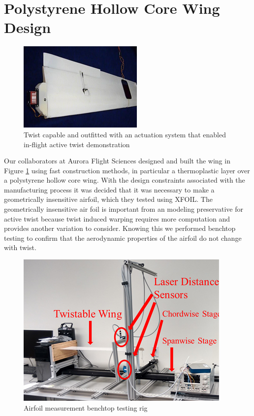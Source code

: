 \documentclass[11pt]{ucthesis}
\begin{document}
\section{Polystyrene Hollow Core Wing Design}

\begin{figure}[h]
\centering
\includegraphics[width=0.5\linewidth]{Figures/AuroraWing.png}
\caption{Twist capable and outfitted with an actuation system that enabled in-flight active twist demonstration}
\label{fig:Awing}
\end{figure}

Our collaborators at Aurora Flight Sciences designed and built the wing in Figure \ref{fig:Awing} using fast construction methods, in particular a thermoplastic layer over a polystyrene hollow core wing. With the design constraints associated with the manufacturing process it was decided that it was necessary to make a geometrically insensitive airfoil, which they tested using XFOIL. The geometrically insensitive air foil is important from an modeling preservative for active twist because twist induced warping requires more computation and provides another variation to consider. Knowing this we performed benchtop testing to confirm that the aerodynamic properties of the airfoil do not change with twist.

\begin{figure}[h]
\centering
\includegraphics[width=0.75\linewidth]{Figures/AuroraWingBenchtopTest.png}
\caption{Airfoil measurement benchtop testing rig}
\label{fig:Atestrig}
\end{figure}
\end{document}
